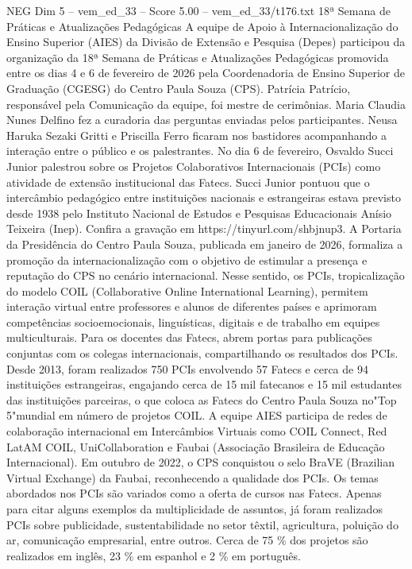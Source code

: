 \begin{textsample}{NEG Dim 5 – vem\_ed\_33 – Score 5.00 – vem\_ed\_33/t176.txt}  \label{ex:f5_neg_073}
18ª Semana de Práticas e Atualizações Pedagógicas A equipe de Apoio à Internacionalização do Ensino Superior (AIES) da Divisão de Extensão e Pesquisa (Depes) participou da organização da 18ª Semana de Práticas e Atualizações Pedagógicas promovida entre os dias 4 e 6 de fevereiro de 2026 pela Coordenadoria de Ensino Superior de Graduação (CGESG) do Centro Paula Souza (CPS).
Patrícia Patrício, responsável pela Comunicação da equipe, foi mestre de cerimônias.
Maria Claudia Nunes Delfino fez a curadoria das perguntas enviadas pelos participantes.
Neusa Haruka Sezaki Gritti e Priscilla Ferro ficaram nos bastidores acompanhando a interação entre o público e os palestrantes.
No dia 6 de fevereiro, Osvaldo Succi Junior palestrou sobre os Projetos Colaborativos Internacionais (PCIs) como atividade de extensão institucional das Fatecs.
Succi Junior pontuou que o intercâmbio pedagógico entre instituições nacionais e estrangeiras estava previsto desde 1938 pelo Instituto Nacional de Estudos e Pesquisas Educacionais Anísio Teixeira (Inep).
Confira a gravação em https://tinyurl.com/shbjnup3.
A Portaria da Presidência do Centro Paula Souza, publicada em janeiro de 2026, formaliza a promoção da internacionalização com o objetivo de estimular a presença e reputação do CPS no cenário internacional.
Nesse sentido, os PCIs, tropicalização do modelo COIL (Collaborative Online International Learning), permitem interação virtual entre professores e alunos de diferentes países e aprimoram competências socioemocionais, linguísticas, digitais e de trabalho em equipes multiculturais.
Para os docentes das Fatecs, abrem portas para publicações conjuntas com os colegas internacionais, compartilhando os resultados dos PCIs.
Desde 2013, foram realizados 750 PCIs envolvendo 57 Fatecs e cerca de 94 instituições estrangeiras, engajando cerca de 15 mil fatecanos e 15 mil estudantes das instituições parceiras, o que coloca as Fatecs do Centro Paula Souza no"Top 5"mundial em número de projetos COIL.
A equipe AIES participa de redes de colaboração internacional em Intercâmbios Virtuais como COIL Connect, Red LatAM COIL, UniCollaboration e Faubai (Associação Brasileira de Educação Internacional).
Em outubro de 2022, o CPS conquistou o selo BraVE (Brazilian Virtual Exchange) da Faubai, reconhecendo a qualidade dos PCIs.
Os temas abordados nos PCIs são variados como a oferta de cursos nas Fatecs.
Apenas para citar alguns exemplos da multiplicidade de assuntos, já foram realizados PCIs sobre publicidade, sustentabilidade no setor têxtil, agricultura, poluição do ar, comunicação empresarial, entre outros.
Cerca de 75 \% dos projetos são realizados em inglês, 23 \% em espanhol e 2 \% em português.

\end{textsample}
